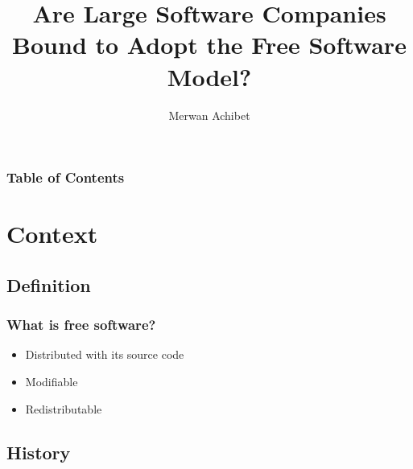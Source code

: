 \documentclass{beamer}
\title{Are Large Software Companies Bound to Adopt the Free Software Model?}
\author{Merwan Achibet}
\institute{Université du Havre}
\date{}
\begin{document}
\maketitle

\begin{frame}
  \frametitle{Table of Contents}
  \tableofcontents
\end{frame}

\section{Context}

\subsection{Definition}

\begin{frame}

  \frametitle{What is free software?}

  \begin{itemize}
    \item<1->{Distributed with its source code}
    \item<2->{Modifiable}
    \item<3->{Redistributable}
  \end{itemize}

  \pause

  \vfill



\end{frame}

\subsection{History}
\end{document}
